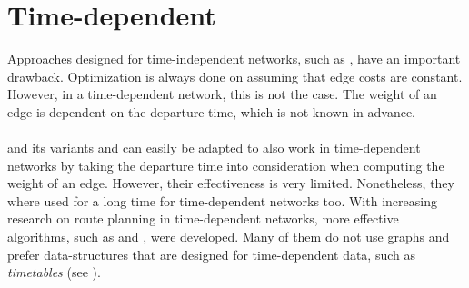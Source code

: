 \section{Time-dependent}\label{time_dependent_sec}
	Approaches designed for time-independent networks, such as \alt, have an important drawback. Optimization is always done on
	assuming that edge costs are constant. However, in a time-dependent network, this is not the case. The weight of an edge is
	dependent on the departure time, which is not known in advance.\\\\
	\dijkstra and its variants \astar and \alt can easily be adapted to also work in time-dependent networks by taking the departure
	time into consideration when computing the weight of an edge. However, their effectiveness is very limited.
	Nonetheless, they where used for a long time for time-dependent networks too. With increasing research on route
	planning in time-dependent networks, more effective algorithms, such as \transferPatterns {}
	and \csa {}, were developed. Many of them do not use graphs and prefer data-structures that are designed
	for time-dependent data, such as \textit{timetables} (see ).

